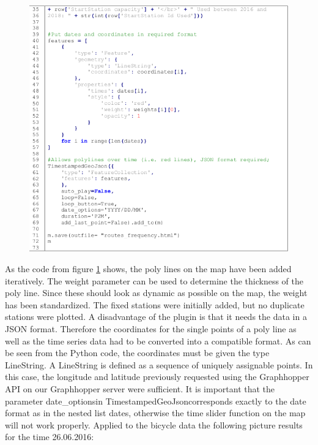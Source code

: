 \begin{figure}[H]
\hspace{-1.6cm}
\includegraphics[width=1.2\textwidth]{img/listing2}\label{fig:listing2}
\label{fig:listing2}
\end{figure}
As the code from figure \ref{fig:listing2} shows, the poly lines on the map have been added iteratively. The
weight parameter can be used to determine the thickness of the poly line. Since these should look
as dynamic as possible on the map, the weight has been standardized. The fixed stations were
initially added, but no duplicate stations were plotted. A disadvantage of the plugin is that it needs
the data in a JSON format. Therefore the coordinates for the single points of a poly line as well as
the time series data had to be converted into a compatible format. As can be seen from the Python
code, the coordinates must be given the type \glqq LineString\grqq.  A LineString is defined as a sequence
of uniquely assignable points. In this case, the longitude and latitude previously requested using
the Graphhopper API on our Graphhopper server were sufficient. It is important that the parameter \glqq date\_options\grqq in \glqq TimestampedGeoJson\grqq corresponds exactly to the date format as in the nested
list dates, otherwise the time slider function on the map will not work properly.
Applied to the bicycle data the following picture results for the time 26.06.2016:
